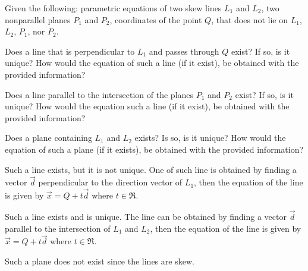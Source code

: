
\begin{Exercise}[
name={},
title={}, 
difficulty=0,
origin={\cite{MB}}]
Given the following: parametric equations of two skew lines $L_1$ and $L_2$, two nonparallel planes $P_1$ and $P_2$, coordinates of the point $Q$, that does not lie on $L_1$, $L_2$, $P_1$, nor $P_2$. 

\Question Does a line that is perpendicular to $L_1$ and passes through $Q$ exist?
If so, is it unique? How would the equation of such a line (if it exist), be obtained with the provided information?

\Question Does a line parallel to the intersection of the planes $P_1$ and $P_2$ exist? If so, is it unique?
How would the equation such a line (if it exist), be obtained with the provided information?

\Question Does a plane containing $L_1$ and $L_2$ exists? Is so, is it unique? How would the equation of such a plane (if it exists), be obtained with the provided information?
\end{Exercise}

\begin{Answer}
\Question Such a line exists, but it is not unique.  One of such line is obtained by finding a vector $\vec{d}$ perpendicular to the direction vector of $L_1$, then the equation of the line is given by $\vec{x}=Q+t\vec{d}$ where $t\in\Re$.

\Question Such a line exists and is unique.  The line can be obtained by finding a vector $\vec{d}$ parallel to the intersection of $L_1$ and $L_2$, then the equation of the line is given by $\vec{x}=Q+t\vec{d}$ where $
t\in\Re$.

\Question Such a plane does not exist since the lines are skew.
\end{Answer}
